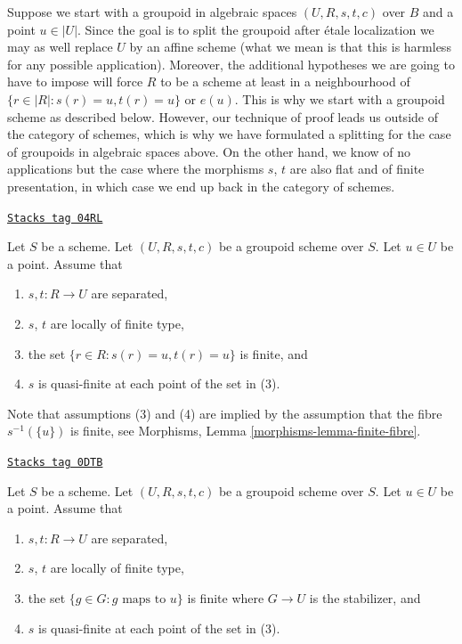 \medskip\noindent
Suppose we start with a groupoid in algebraic spaces
$(U, R, s, t, c)$ over $B$ and a point $u \in |U|$.
Since the goal is to split the groupoid after \'etale localization
we may as well replace $U$ by an affine scheme (what we mean
is that this is harmless for any possible application).
Moreover, the additional hypotheses we are going to have
to impose will force $R$ to be a scheme at least in a neighbourhood
of $\{r \in |R| : s(r) = u, t(r) = u\}$ or $e(u)$. This is why
we start with a groupoid scheme as described below.
However, our technique of proof leads us outside of the category of schemes,
which is why we have formulated a splitting for the case of groupoids
in algebraic spaces above.
On the other hand, we know of no applications but
the case where the morphisms $s$, $t$
are also flat and of finite presentation, in which case
we end up back in the category of schemes.

\begin{definition}

\label{spaces-more-groupoids-situation-strong-splitting}
\href{https://stacks.math.columbia.edu/tag/04RL}{\texttt{Stacks tag 04RL}}

Let $S$ be a scheme.
Let $(U, R, s, t, c)$ be a groupoid scheme over $S$.
Let $u \in U$ be a point. Assume that
\begin{enumerate}
\item $s, t : R \to U$ are separated,
\item $s$, $t$ are locally of finite type,
\item the set $\{r \in R : s(r) = u, t(r) = u\}$ is finite, and
\item $s$ is quasi-finite at each point of the set in (3).
\end{enumerate}
Note that assumptions (3) and (4) are implied by the assumption
that the fibre $s^{-1}(\{u\})$ is finite, see
Morphisms, Lemma \ref{morphisms-lemma-finite-fibre}.
\end{definition}

\begin{definition}

\label{spaces-more-groupoids-situation-splitting}
\href{https://stacks.math.columbia.edu/tag/0DTB}{\texttt{Stacks tag 0DTB}}

Let $S$ be a scheme.
Let $(U, R, s, t, c)$ be a groupoid scheme over $S$.
Let $u \in U$ be a point. Assume that
\begin{enumerate}
\item $s, t : R \to U$ are separated,
\item $s$, $t$ are locally of finite type,
\item the set $\{g \in G : g\text{ maps to }u\}$ is finite where $G \to U$
is the stabilizer, and
\item $s$ is quasi-finite at each point of the set in (3).
\end{enumerate}
\end{definition}

